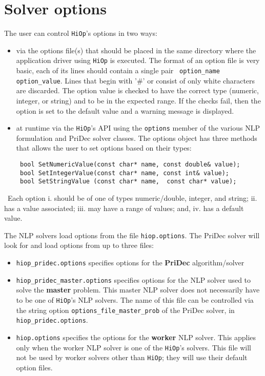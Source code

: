 \documentclass[11pt]{article}
\newcounter{line}
\newcommand{\warningSymbol}{\raisebox{0.9\depth}{\danger}}
\newcommand{\warningcp}[1]{%
        \smallskip \noindent \textcolor{warningColorText}{\warningSymbol{}}\,\textbf{#1} %
    }
\newcommand{\Hi}{\texttt{HiOp}\xspace}
\begin{document}
\section{Solver options}
The user can control \Hi's options in two ways:
\begin{itemize}
\item via the options file(s) that should be placed in the same directory where the application driver using \Hi is executed. The format of an option file is very basic, each of its lines should contain a single pair \texttt{ option\_name option\_value}. Lines that begin with '\#' or consist of only white characters are discarded. The option value is checked to have the correct type (numeric, integer, or string) and to be in the expected range. If the checks fail, then the option is set to the default value and a warning message is displayed.
\item at runtime via the \Hi's API using the \texttt{options} member of the various NLP formulation and PriDec solver classes. The options object has three methods that allows the user to set options based on their types:
\begin{lstlisting}
 bool SetNumericValue(const char* name, const double& value);
 bool SetIntegerValue(const char* name, const int& value);
 bool SetStringValue (const char* name,  const char* value);
\end{lstlisting}
\end{itemize}

\warningcp{} Each option i. should be of one of types numeric/double, integer, and string; ii. has a value associated; iii. may have a range of values;  and, iv. has a default value. 

The NLP solvers load options from the file \texttt{hiop.options}. The PriDec solver will look for and load options from up to three files:
\begin{itemize}
\item \texttt{hiop\_pridec.options} specifies options for the \textbf{PriDec} algorithm/solver
\item \texttt{hiop\_pridec\_master.options} specifies options for the NLP solver used to solve the \textbf{master} problem. This master NLP solver does not necessarily have to be one of \Hi's NLP solvers. The name of this file can be controlled via the string option \texttt{options\_file\_master\_prob} of the PriDec solver, in \texttt{hiop\_pridec.options}.
\item \texttt{hiop.options} specifies the options for the \textbf{worker} NLP solver. This applies only when the worker NLP solver is one of the \Hi's solvers. This file will not be used by worker solvers other than \Hi; they will use their default option files.
\end{itemize}
\end{document}
